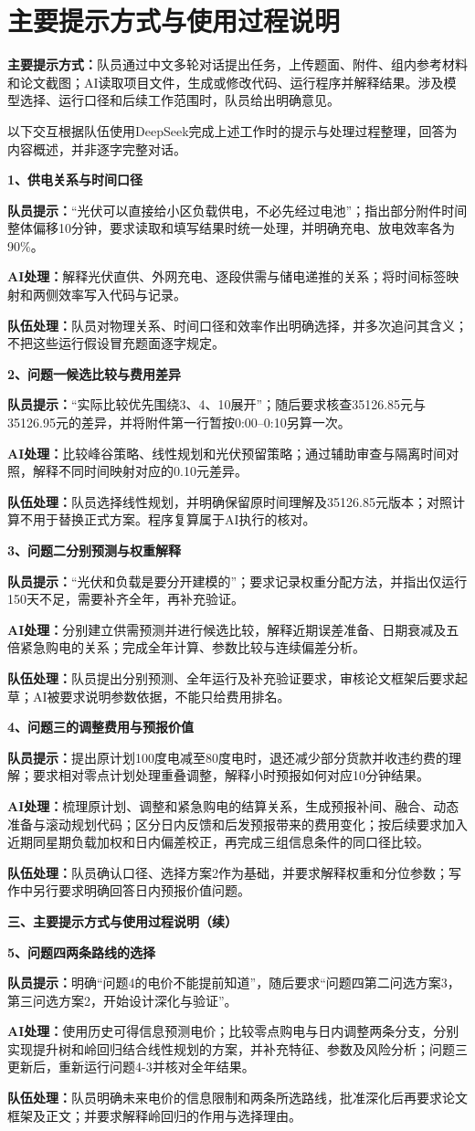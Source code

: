 \documentclass[UTF8,a4paper,12pt]{ctexart}
\newcommand{\field}[2]{\par\noindent\textbf{#1：}#2\par}
\newcommand{\example}[2]{\vspace{6pt}\noindent\textbf{#1、#2}\par}
\begin{document}
\newpage
\section{主要提示方式与使用过程说明}
\field{主要提示方式}{队员通过中文多轮对话提出任务，上传题面、附件、组内参考材料和论文截图；AI读取项目文件，生成或修改代码、运行程序并解释结果。涉及模型选择、运行口径和后续工作范围时，队员给出明确意见。}
以下交互根据队伍使用DeepSeek完成上述工作时的提示与处理过程整理，回答为内容概述，并非逐字完整对话。

\example{1}{供电关系与时间口径}
\field{队员提示}{“光伏可以直接给小区负载供电，不必先经过电池”；指出部分附件时间整体偏移10分钟，要求读取和填写结果时统一处理，并明确充电、放电效率各为90\%。}
\field{AI处理}{解释光伏直供、外网充电、逐段供需与储电递推的关系；将时间标签映射和两侧效率写入代码与记录。}
\field{队伍处理}{队员对物理关系、时间口径和效率作出明确选择，并多次追问其含义；不把这些运行假设冒充题面逐字规定。}

\example{2}{问题一候选比较与费用差异}
\field{队员提示}{“实际比较优先围绕3、4、10展开”；随后要求核查35126.85元与35126.95元的差异，并将附件第一行暂按0:00--0:10另算一次。}
\field{AI处理}{比较峰谷策略、线性规划和光伏预留策略；通过辅助审查与隔离时间对照，解释不同时间映射对应的0.10元差异。}
\field{队伍处理}{队员选择线性规划，并明确保留原时间理解及35126.85元版本；对照计算不用于替换正式方案。程序复算属于AI执行的核对。}

\example{3}{问题二分别预测与权重解释}
\field{队员提示}{“光伏和负载是要分开建模的”；要求记录权重分配方法，并指出仅运行150天不足，需要补齐全年，再补充验证。}
\field{AI处理}{分别建立供需预测并进行候选比较，解释近期误差准备、日期衰减及五倍紧急购电的关系；完成全年计算、参数比较与连续偏差分析。}
\field{队伍处理}{队员提出分别预测、全年运行及补充验证要求，审核论文框架后要求起草；AI被要求说明参数依据，不能只给费用排名。}

\example{4}{问题三的调整费用与预报价值}
\field{队员提示}{提出原计划100度电减至80度电时，退还减少部分货款并收违约费的理解；要求相对零点计划处理重叠调整，解释小时预报如何对应10分钟结果。}
\field{AI处理}{梳理原计划、调整和紧急购电的结算关系，生成预报补间、融合、动态准备与滚动规划代码；区分日内反馈和后发预报带来的费用变化；按后续要求加入近期同星期负载加权和日内偏差校正，再完成三组信息条件的同口径比较。}
\field{队伍处理}{队员确认口径、选择方案2作为基础，并要求解释权重和分位参数；写作中另行要求明确回答日内预报价值问题。}

\newpage
\noindent\textbf{三、主要提示方式与使用过程说明（续）}

\example{5}{问题四两条路线的选择}
\field{队员提示}{明确“问题4的电价不能提前知道”，随后要求“问题四第二问选方案3，第三问选方案2，开始设计深化与验证”。}
\field{AI处理}{使用历史可得信息预测电价；比较零点购电与日内调整两条分支，分别实现提升树和岭回归结合线性规划的方案，并补充特征、参数及风险分析；问题三更新后，重新运行问题4-3并核对全年结果。}
\field{队伍处理}{队员明确未来电价的信息限制和两条所选路线，批准深化后再要求论文框架及正文；并要求解释岭回归的作用与选择理由。}
\end{document}
